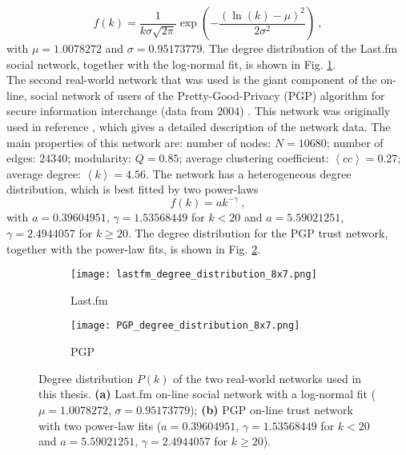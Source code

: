 \documentclass[11 pt , letterpaper , twoside , openright]{book}
\begin{document}
\begin{equation}
	f(k) = \frac{1}{k \sigma \sqrt{2\pi}} \exp(-\frac{(\ln(k) - \mu)^2}{2 \sigma^2})\ ,
\end{equation}
with $\mu = 1.0078272$ and $\sigma = 0.95173779$. The degree distribution of the Last.fm social network, together with the log-normal fit, is shown in Fig. \ref{deg_distr_lastfm}.\\
\newline
The second real-world network that was used is the giant component of the on-line, social network of users of the Pretty-Good-Privacy (PGP) algorithm for secure information interchange (data from $2004$) \cite{ICON}. This network was originally used in reference \cite{Boguna2004}, which gives a detailed description of the network data. The main properties of this network are: number of nodes: $N = 10680$; number of edges: $24340$; modularity: $Q = 0.85$; average clustering coefficient: $\left<cc\right> = 0.27$; average degree: $\left<k\right> = 4.56$. The network has a heterogeneous degree distribution, which is best fitted by two power-laws
\begin{equation}
 f(k) = a k^{-\gamma} \ ,
\end{equation}
with $a = 0.39604951$, $\gamma = 1.53568449$ for $k < 20$ and $a = 5.59021251$, $\gamma = 2.4944057$ for $k \geqslant 20$. The degree distribution for the PGP trust network, together with the power-law fits, is shown in Fig. \ref{deg_distr_pgp}. 

\begin{figure}[H]
  \begin{subfigure}[b]{0.49\textwidth}
    \caption{Last.fm}
    \texttt{[image: lastfm\_degree\_distribution\_8x7.png]}
    \label{deg_distr_lastfm}
  \end{subfigure}
  \begin{subfigure}[b]{0.49\textwidth}
    \caption{PGP}
    \texttt{[image: PGP\_degree\_distribution\_8x7.png]}
    \label{deg_distr_pgp}
  \end{subfigure}
  \captionsetup{format=plain}
  \caption[Degree distribution $P(k)$ of the two real-world networks used in this thesis.]{Degree distribution $P(k)$ of the two real-world networks used in this thesis. \textbf{(a)} Last.fm on-line social network with a log-normal fit ($\mu = 1.0078272$, $\sigma = 0.95173779$); \textbf{(b)} PGP on-line trust network with two power-law fits ($a = 0.39604951$, $\gamma = 1.53568449$ for $k < 20$ and $a = 5.59021251$, $\gamma = 2.4944057$ for $k \geqslant 20$).}
\label{deg_distr_real_network}
\end{figure}
\end{document}
